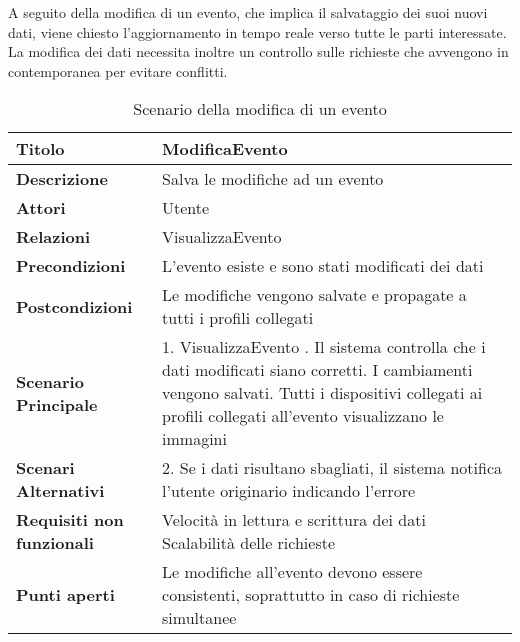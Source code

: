 \clearpage
A seguito della modifica di un evento, che implica il salvataggio dei suoi nuovi dati, viene chiesto l'aggiornamento in tempo reale verso tutte le parti interessate.
La modifica dei dati necessita inoltre un controllo sulle richieste che avvengono in contemporanea per evitare conflitti.\\
\begin{table}[htbp]
    \begin{tabular} {|P{4.5cm}|P{11cm}|}
        \hline
        \textbf{Titolo}                   & ModificaEvento                                                                               \\
        \hline
        \textbf{Descrizione}              & Salva le modifiche ad un evento                                                              \\
        \hline
        \textbf{Attori}                   & Utente                                                                                       \\
        \hline
        \textbf{Relazioni}                & VisualizzaEvento                                                                             \\
        \hline
        \textbf{Precondizioni}            & L'evento esiste e sono stati modificati dei dati                                             \\
        \hline
        \textbf{Postcondizioni}           & Le modifiche vengono salvate e propagate a tutti i profili collegati                         \\
        \hline
        \textbf{Scenario Principale}      & 1. VisualizzaEvento . Il sistema controlla che i dati modificati siano corretti. I cambiamenti vengono salvati. Tutti i dispositivi collegati ai profili collegati all'evento visualizzano le immagini                                        \\
        \hline
        \textbf{Scenari Alternativi}      & 2. Se i dati risultano sbagliati, il sistema notifica l'utente originario indicando l'errore \\
        \hline
        \textbf{Requisiti non funzionali} & Velocità in lettura e scrittura dei dati \newline
        Scalabilità delle richieste                                                                                                      \\
        \hline
        \textbf{Punti aperti}             & Le modifiche all'evento devono essere consistenti, soprattutto in caso di richieste simultanee     \\
        \hline
    \end{tabular}
    \caption{Scenario della modifica di un evento}
\end{table}

